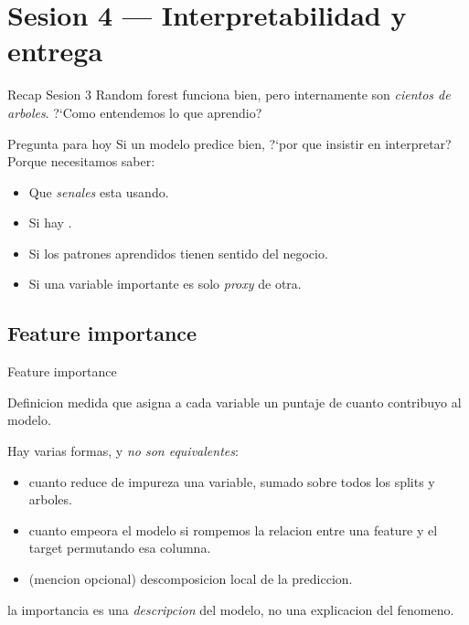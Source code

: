 \section[Interpretabilidad]{Sesion 4 — Interpretabilidad y entrega\label{sec:interp-w15}}

\begin{frame}{Recap Sesion 3}
Random forest funciona bien, pero internamente son \emph{cientos de arboles}. ?`Como entendemos lo que aprendio?

\vspace{0.4em}
\begin{block}{Pregunta para hoy}
\small
Si un modelo predice bien, ?`por que insistir en interpretar? Porque necesitamos saber:
\begin{itemize}\footnotesize
  \item Que \emph{senales} esta usando.
  \item Si hay .
  \item Si los patrones aprendidos tienen sentido del negocio.
  \item Si una variable importante es solo \emph{proxy} de otra.
\end{itemize}
\end{block}
\end{frame}

\subsection{Feature importance}

\begin{frame}{Feature importance}
\begin{block}{Definicion}
\small
{} medida que asigna a cada variable un puntaje de cuanto contribuyo al modelo.
\end{block}

\vspace{0.3em}
Hay varias formas, y \emph{no son equivalentes}:
\begin{itemize}\small
  \item {} cuanto reduce de impureza una variable, sumado sobre todos los splits y arboles.
  \item {} cuanto empeora el modelo si rompemos la relacion entre una feature y el target permutando esa columna.
  \item {} (mencion opcional) descomposicion local de la prediccion.
\end{itemize}

\vspace{0.25em}
 la importancia es una \emph{descripcion} del modelo, no una explicacion del fenomeno.
\end{frame}

